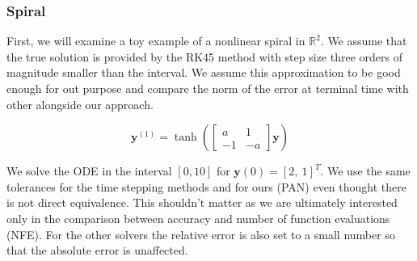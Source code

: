 \documentclass[11pt]{report}
\begin{document}
    \subsubsection{Spiral}
    First, we will examine a toy example of a nonlinear spiral in $\mathbb{R}^{2}$.
    We assume that the true solution is provided by the RK45 method with step size three orders of magnitude smaller than the
    interval.
    We assume this approximation to be good enough for out purpose and compare the norm of the error at terminal time
    with other alongside our approach.

    \begin{equation*}
        \pmb{y}^{(1)}  =
        \tanh(
        \begin{bmatrix}
            a & 1 \\ -1 & -a
        \end{bmatrix}
        \pmb{y}
        )
    \end{equation*}

    We solve the ODE in the interval $[0,10]$ for $\pmb{y}(0) = [2,\ 1]^T$.
    We use the same tolerances for the time stepping methods and for ours (PAN) even thought there is not direct
    equivalence.
    This shouldn't matter as we are ultimately interested only in the comparison between accuracy and number of function
    evaluations (NFE).
    For the other solvers the relative error is also set to a small number so that the absolute error is unaffected.
\end{document}
